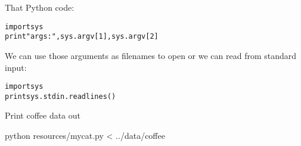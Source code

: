 \begin{fullwidth}
 That Python code:
 
\begin{alltt}
import sys
print "args:", sys.argv[1], sys.argv[2]
\end{alltt}

We can use those arguments as filenames to open or we can read from standard input:
 
\begin{alltt}
import sys
print sys.stdin.readlines()  
\end{alltt}

Print coffee data out

{\small
\bash[script,stdout,prefix=$]
python resources/mycat.py < ../data/coffee
\END
}

\end{fullwidth}
